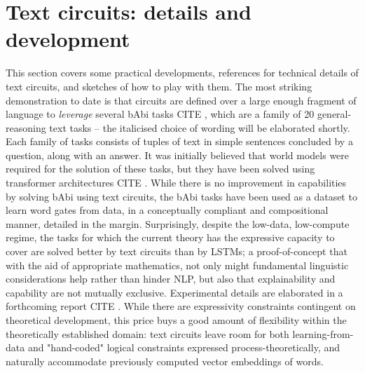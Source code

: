 \section{Text circuits: details and development}\label{sec:circs}


This section covers some practical developments, references for technical details of text circuits, and sketches of how to play with them. The most striking demonstration to date is that circuits are defined over a large enough fragment of language to \emph{leverage} several bAbi tasks \bR CITE \e, which are a family of 20 general-reasoning text tasks -- the italicised choice of wording will be elaborated shortly. Each family of tasks consists of tuples of text in simple sentences concluded by a question, along with an answer. It was initially believed that world models were required for the solution of these tasks, but they have been solved using transformer architectures \bR CITE \e. While there is no improvement in capabilities by solving bAbi using text circuits, the bAbi tasks have been used as a dataset to learn word gates from data, in a conceptually compliant and compositional manner, detailed in the margin. Surprisingly, despite the low-data, low-compute regime, the tasks for which the current theory has the expressive capacity to cover are solved better by text circuits than by LSTMs; a proof-of-concept that with the aid of appropriate mathematics, not only might fundamental linguistic considerations help rather than hinder NLP, but also that explainability and capability are not mutually exclusive. Experimental details are elaborated in a forthcoming report \bR CITE \e. While there are expressivity constraints contingent on theoretical development, this price buys a good amount of flexibility within the theoretically established domain: text circuits leave room for both learning-from-data and "hand-coded" logical constraints expressed process-theoretically, and naturally accommodate previously computed vector embeddings of words.\\

